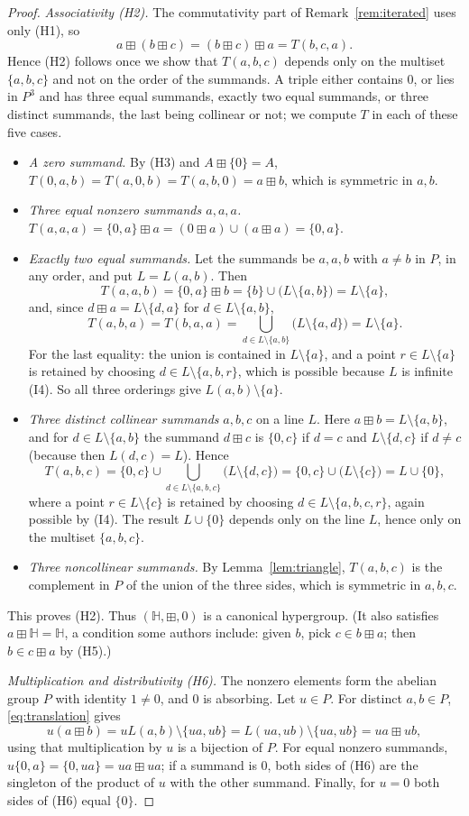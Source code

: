 \documentclass[11pt]{article}
\theoremstyle{plain}
\theoremstyle{definition}
\newcommand{\Hh}{\mathbb{H}}
\newcommand{\bp}{\boxplus}
\begin{document}
\begin{proof}
\emph{Associativity (H2).}  The commutativity part of
Remark~\ref{rem:iterated} uses only (H1), so
\[
 a\bp(b\bp c)=(b\bp c)\bp a=T(b,c,a).
\]
Hence (H2) follows once we show that $T(a,b,c)$ depends only on the
multiset $\{a,b,c\}$ and not on the order of the summands.  A triple
either contains $0$, or lies in $P^3$ and has three equal summands,
exactly two equal summands, or three distinct summands, the last being
collinear or not; we compute $T$ in each of these five cases.
\begin{itemize}
\item \emph{A zero summand.}  By (H3) and $A\bp\{0\}=A$,
$T(0,a,b)=T(a,0,b)=T(a,b,0)=a\bp b$, which is symmetric in $a,b$.
\item \emph{Three equal nonzero summands $a,a,a$.}
$T(a,a,a)=\{0,a\}\bp a=(0\bp a)\cup(a\bp a)=\{0,a\}$.
\item \emph{Exactly two equal summands.}  Let the summands be $a,a,b$
with $a\neq b$ in $P$, in any order, and put $L=L(a,b)$.  Then
\[
 T(a,a,b)=\{0,a\}\bp b=\{b\}\cup\bigl(L\setminus\{a,b\}\bigr)
 =L\setminus\{a\},
\]
and, since $d\bp a=L\setminus\{d,a\}$ for $d\in L\setminus\{a,b\}$,
\[
 T(a,b,a)=T(b,a,a)
 =\bigcup_{d\in L\setminus\{a,b\}}\bigl(L\setminus\{a,d\}\bigr)
 =L\setminus\{a\}.
\]
For the last equality: the union is contained in $L\setminus\{a\}$, and
a point $r\in L\setminus\{a\}$ is retained by choosing
$d\in L\setminus\{a,b,r\}$, which is possible because $L$ is infinite
(I4).  So all three orderings give $L(a,b)\setminus\{a\}$.
\item \emph{Three distinct collinear summands} $a,b,c$ on a line $L$.
Here $a\bp b=L\setminus\{a,b\}$, and for $d\in L\setminus\{a,b\}$ the
summand $d\bp c$ is $\{0,c\}$ if $d=c$ and $L\setminus\{d,c\}$ if
$d\neq c$ (because then $L(d,c)=L$).  Hence
\[
 T(a,b,c)=\{0,c\}\cup\bigcup_{d\in L\setminus\{a,b,c\}}
 \bigl(L\setminus\{d,c\}\bigr)=\{0,c\}\cup\bigl(L\setminus\{c\}\bigr)
 =L\cup\{0\},
\]
where a point $r\in L\setminus\{c\}$ is retained by choosing
$d\in L\setminus\{a,b,c,r\}$, again possible by (I4).  The result
$L\cup\{0\}$ depends only on the line $L$, hence only on the multiset
$\{a,b,c\}$.
\item \emph{Three noncollinear summands.}  By
Lemma~\ref{lem:triangle}, $T(a,b,c)$ is the complement in $P$ of the
union of the three sides, which is symmetric in $a,b,c$.
\end{itemize}
This proves (H2).  Thus $(\Hh,\bp,0)$ is a canonical hypergroup.  (It
also satisfies $a\bp\Hh=\Hh$, a condition some authors include: given
$b$, pick $c\in b\bp a$; then $b\in c\bp a$ by (H5).)

\emph{Multiplication and distributivity (H6).}  The nonzero elements
form the abelian group $P$ with identity $1\neq0$, and $0$ is
absorbing.  Let $u\in P$.  For distinct $a,b\in P$,
\eqref{eq:translation} gives
\[
 u(a\bp b)=uL(a,b)\setminus\{ua,ub\}=L(ua,ub)\setminus\{ua,ub\}
 =ua\bp ub,
\]
using that multiplication by $u$ is a bijection of $P$.  For equal
nonzero summands, $u\{0,a\}=\{0,ua\}=ua\bp ua$; if a summand is $0$,
both sides of (H6) are the singleton of the product of $u$ with the
other summand.  Finally, for $u=0$ both sides of (H6) equal $\{0\}$.
\end{proof}
\end{document}
